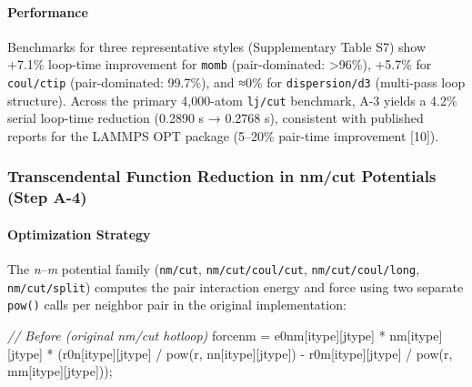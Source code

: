 \documentclass[
  11pt,
]{article}
\newenvironment{Shaded}{}{}
\newcommand{\CommentTok}[1]{\textcolor[rgb]{0.38,0.63,0.69}{\textit{#1}}}
\newcommand{\NormalTok}[1]{#1}
\newcommand{\OperatorTok}[1]{\textcolor[rgb]{0.40,0.40,0.40}{#1}}
\begin{document}
\paragraph{Performance}\label{performance}

Benchmarks for three representative styles (Supplementary Table S7) show
+7.1\% loop-time improvement for \texttt{momb} (pair-dominated:
\textgreater96\%), +5.7\% for \texttt{coul/ctip} (pair-dominated:
99.7\%), and ≈0\% for \texttt{dispersion/d3} (multi-pass loop
structure). Across the primary 4,000-atom \texttt{lj/cut} benchmark, A-3
yields a 4.2\% serial loop-time reduction (0.2890 s → 0.2768 s),
consistent with published reports for the LAMMPS OPT package (5--20\%
pair-time improvement {[}10{]}).

\subsubsection{Transcendental Function Reduction in nm/cut Potentials
(Step
A-4)}\label{transcendental-function-reduction-in-nmcut-potentials-step-a-4}

\paragraph{Optimization Strategy}\label{optimization-strategy}

The \emph{n}--\emph{m} potential family (\texttt{nm/cut},
\texttt{nm/cut/coul/cut}, \texttt{nm/cut/coul/long},
\texttt{nm/cut/split}) computes the pair interaction energy and force
using two separate \texttt{pow()} calls per neighbor pair in the
original implementation:

\begin{Shaded}
\begin{Highlighting}[]
\CommentTok{// Before (original nm/cut hotloop)}
\NormalTok{forcenm }\OperatorTok{=}\NormalTok{ e0nm}\OperatorTok{[}\NormalTok{itype}\OperatorTok{][}\NormalTok{jtype}\OperatorTok{]} \OperatorTok{*}\NormalTok{ nm}\OperatorTok{[}\NormalTok{itype}\OperatorTok{][}\NormalTok{jtype}\OperatorTok{]} \OperatorTok{*}
          \OperatorTok{(}\NormalTok{r0n}\OperatorTok{[}\NormalTok{itype}\OperatorTok{][}\NormalTok{jtype}\OperatorTok{]} \OperatorTok{/}\NormalTok{ pow}\OperatorTok{(}\NormalTok{r}\OperatorTok{,}\NormalTok{ nn}\OperatorTok{[}\NormalTok{itype}\OperatorTok{][}\NormalTok{jtype}\OperatorTok{])}
           \OperatorTok{{-}}\NormalTok{ r0m}\OperatorTok{[}\NormalTok{itype}\OperatorTok{][}\NormalTok{jtype}\OperatorTok{]} \OperatorTok{/}\NormalTok{ pow}\OperatorTok{(}\NormalTok{r}\OperatorTok{,}\NormalTok{ mm}\OperatorTok{[}\NormalTok{itype}\OperatorTok{][}\NormalTok{jtype}\OperatorTok{]));}
\end{Highlighting}
\end{Shaded}
\end{document}
